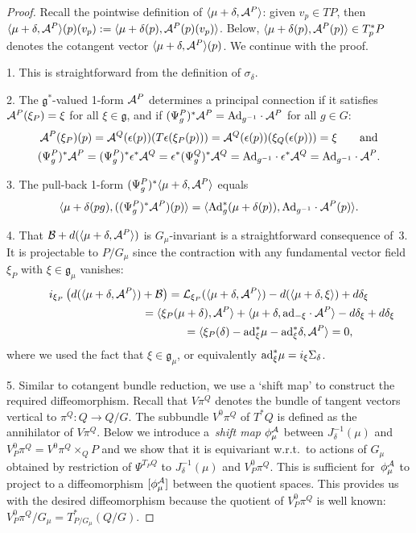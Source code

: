 \documentclass[pdftex]{sigma}
\newcommand{\A}{{\cal A}}
\newcommand{\B}{{\cal B}}
\newcommand{\e}{\epsilon}
\newcommand{\lag}{\mathfrak{g}}
\begin{document}
\begin{proof} Recall the pointwise def\/inition of $\langle \mu +\delta,\A^P\rangle$: given $v_p\in TP$, then $\langle \mu +\delta,\A^P\rangle(p)(v_p) := \langle  \mu +\delta(p),\A^P(p)(v_p)\rangle$. Below, $\langle \mu +\delta(p),\A^P(p)\rangle\in T^*_pP$ denotes the cotangent vector $\langle \mu +\delta,\A^P\rangle(p)$. We continue with the proof.

1. This is straightforward from the def\/inition of $\sigma_\delta$.

 2. The $\lag^*$-valued 1-form $\A^P$ determines a principal connection if it satisf\/ies $\A^P(\xi_P)=\xi$ for all $\xi\in\lag$, and if $(\Psi^P_g)^*\A^P={\rm Ad}_{g^{-1}}\cdot \A^P$ for all $g\in G$:
\begin{gather*}
  \A^P(\xi_P)(p) = \A^Q(\e(p))(T\e(\xi_P(p)))= \A^Q(\e(p))(\xi_Q(\e(p))) = \xi \qquad \mbox{and}\\
 (\Psi^P_g)^*\A^P= (\Psi^P_g)^*\e^*\A^Q = \e^* (\Psi^Q_g)^*\A^Q = {\rm Ad}_{g^{-1}}\cdot \e^*\A^Q ={\rm Ad}_{g^{-1}}\cdot\A^P.
\end{gather*}

3. The pull-back 1-form $(\Psi^P_g)^*\langle \mu +\delta,\A^P\rangle$ equals
\[
 \langle \mu +\delta(pg),((\Psi^P_g)^*\A^P)(p)\rangle=\langle {\rm Ad}_g^*( \mu +\delta(p)),{\rm Ad}_{g^{-1}}\cdot\A^P(p)\rangle.
\]

 4. That $\B + d(\langle \mu +\delta,\A^P\rangle)$ is $G_\mu$-invariant is a straightforward consequence of~3. It is projectable to $P/G_\mu$ since the contraction with any fundamental vector f\/ield $\xi_P$ with $\xi\in\lag_\mu$ vanishes:
    \begin{gather*}
 i_{\xi_P}\left(d(\langle \mu +\delta,\A^P\rangle)+\B\right)   = {\cal L}_{\xi_P}(\langle \mu +\delta,\A^P\rangle)- d(\langle\mu+\delta,\xi\rangle) + d\delta_{\xi}  \\
 \phantom{i_{\xi_P}\left(d(\langle \mu +\delta,\A^P\rangle)+\B\right)  }{}
 = \langle \xi_P(\mu+\delta),\A^P\rangle + \langle\mu+\delta,{\rm ad}_{-\xi}\cdot\A^P\rangle - d\delta_\xi  + d\delta_{\xi}\\
 \phantom{i_{\xi_P}\left(d(\langle \mu +\delta,\A^P\rangle)+\B\right)  }{}
  = \langle \xi_P(\delta)-{\rm ad}^*_\xi\mu-{\rm ad}^*_\xi \delta,\A^P\rangle =0,
\end{gather*}
where we used the fact that $\xi\in\lag_\mu$, or equivalently ${\rm ad}^*_\xi\mu = i_\xi\Sigma_\delta$.

 5. Similar to cotangent bundle reduction, we use a `shift map' to construct the required dif\/feomorphism. Recall that $V\pi^Q$ denotes the bundle of tangent vectors vertical to $\pi^Q:Q\to Q/G$. The subbundle $V^0\pi^Q$ of $T^*Q$ is def\/ined as the annihilator of $V\pi^Q$. Below we introduce a~{\em shift map} $\phi_\mu^{\A}$ between $J^{-1}_\delta(\mu)$ and $V^0_P\pi^Q = V^0\pi^Q\times_Q P$ and we show that it is equivariant w.r.t.\ to actions of $G_\mu$ obtained by restriction of $\Psi^{T_PQ}$ to $J_\delta^{-1}(\mu)$ and $V^0_P\pi^Q$. This is suf\/f\/icient for~$\phi_\mu^{\A}$ to project to a dif\/feomorphism $[\phi_\mu^{\A}]$ between the quotient spaces. This provides us with the desired dif\/feomorphism because the quotient of $V^0_P\pi^Q$ is well known: $V^0_P\pi^Q/G_\mu = T^*_{P/G_\mu}(Q/G)$.


\end{proof}
\end{document}
